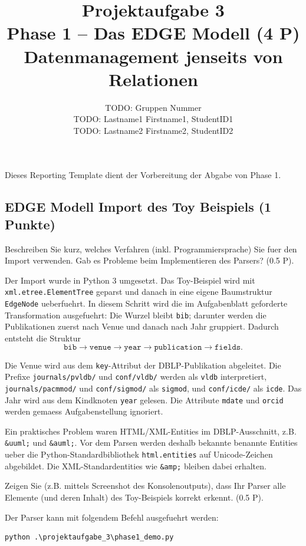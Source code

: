 \documentclass[11pt]{scrartcl}
\title{
  \textbf{\large Projektaufgabe 3 } \\
  Phase 1 -- Das EDGE Modell (4 P) \\
  {\large Datenmanagement jenseits von Relationen}
}
\author{
  TODO: Gruppen Nummer \\
  \large TODO: Lastname1 Firstname1, StudentID1 \\
  \large TODO: Lastname2 Firstname2, StudentID2
}
\begin{document}
\maketitle\thispagestyle{empty}

Dieses Reporting Template dient der Vorbereitung der Abgabe von Phase 1.

\subsection*{EDGE Modell Import des Toy Beispiels (1 Punkte)}

Beschreiben Sie kurz, welches Verfahren (inkl. Programmiersprache) Sie fuer den Import verwenden. Gab es Probleme beim Implementieren des Parsers? (0.5 P).

Der Import wurde in Python 3 umgesetzt. Das Toy-Beispiel wird mit \texttt{xml.etree.ElementTree} geparst und danach in eine eigene Baumstruktur \texttt{EdgeNode} ueberfuehrt. In diesem Schritt wird die im Aufgabenblatt geforderte Transformation ausgefuehrt: Die Wurzel bleibt \texttt{bib}; darunter werden die Publikationen zuerst nach Venue und danach nach Jahr gruppiert. Dadurch entsteht die Struktur
\[
\texttt{bib} \rightarrow \texttt{venue} \rightarrow \texttt{year} \rightarrow \texttt{publication} \rightarrow \texttt{fields}.
\]

Die Venue wird aus dem \texttt{key}-Attribut der DBLP-Publikation abgeleitet. Die Prefixe \texttt{journals/pvldb/} und \texttt{conf/vldb/} werden als \texttt{vldb} interpretiert, \texttt{journals/pacmmod/} und \texttt{conf/sigmod/} als \texttt{sigmod}, und \texttt{conf/icde/} als \texttt{icde}. Das Jahr wird aus dem Kindknoten \texttt{year} gelesen. Die Attribute \texttt{mdate} und \texttt{orcid} werden gemaess Aufgabenstellung ignoriert.

Ein praktisches Problem waren HTML/XML-Entities im DBLP-Ausschnitt, z.B. \texttt{\&uuml;} und \texttt{\&auml;}. Vor dem Parsen werden deshalb bekannte benannte Entities ueber die Python-Standardbibliothek \texttt{html.entities} auf Unicode-Zeichen abgebildet. Die XML-Standardentities wie \texttt{\&amp;} bleiben dabei erhalten.

Zeigen Sie (z.B. mittels Screenshot des Konsolenoutputs), dass Ihr Parser alle Elemente (und deren Inhalt) des Toy-Beispiels korrekt erkennt. (0.5 P).

Der Parser kann mit folgendem Befehl ausgefuehrt werden:

\begin{lstlisting}[style=dmrPython]
python .\projektaufgabe_3\phase1_demo.py
\end{lstlisting}
\end{document}
